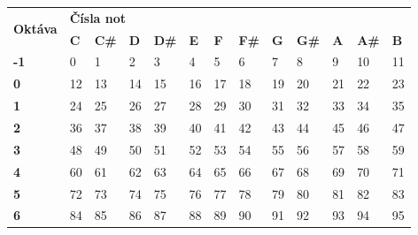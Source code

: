 \begin{table}[]
    \centering
    \begin{tabular}{l|llllllllllll}
        \multirow{2}{*}{\textbf{Oktáva}} & \multicolumn{12}{l}{\textbf{Čísla not}}                                                                                                                             \\
                                         & \textbf{C} & \textbf{C\#} & \textbf{D} & \textbf{D\#} & \textbf{E} & \textbf{F} & \textbf{F\#} & \textbf{G} & \textbf{G\#} & \textbf{A} & \textbf{A\#} & \textbf{B} \\ \hline
        \textbf{-1}                      & 0          & 1            & 2          & 3            & 4          & 5          & 6            & 7          & 8            & 9          & 10           & 11         \\
        \textbf{0}                       & 12         & 13           & 14         & 15           & 16         & 17         & 18           & 19         & 20           & 21         & 22           & 23         \\
        \textbf{1}                       & 24         & 25           & 26         & 27           & 28         & 29         & 30           & 31         & 32           & 33         & 34           & 35         \\
        \textbf{2}                       & 36         & 37           & 38         & 39           & 40         & 41         & 42           & 43         & 44           & 45         & 46           & 47         \\
        \textbf{3}                       & 48         & 49           & 50         & 51           & 52         & 53         & 54           & 55         & 56           & 57         & 58           & 59         \\
        \textbf{4}                       & 60         & 61           & 62         & 63           & 64         & 65         & 66           & 67         & 68           & 69         & 70           & 71         \\
        \textbf{5}                       & 72         & 73           & 74         & 75           & 76         & 77         & 78           & 79         & 80           & 81         & 82           & 83         \\
        \textbf{6}                       & 84         & 85           & 86         & 87           & 88         & 89         & 90           & 91         & 92           & 93         & 94           & 95         \\

\end{tabular}
\end{table}
